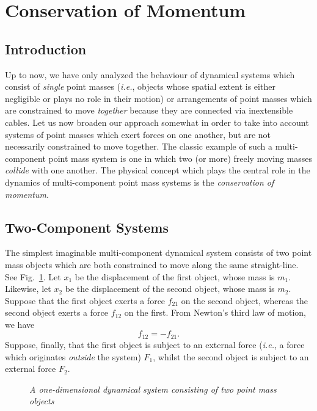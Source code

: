 \section{Conservation of Momentum}
\subsection{Introduction}
Up to now, we have  only analyzed the behaviour of dynamical systems
which consist of {\em single} point masses ({\em i.e.}, objects whose spatial extent is either
negligible or plays no role in their motion) or arrangements of point masses which are constrained to
move {\em together} because they are connected via inextensible cables. Let us now
broaden our approach somewhat  in order to take into account systems of point masses which exert forces on
one another, but are not necessarily constrained to move together. The classic example of
such a multi-component point mass
system is one in which two (or more) freely moving  masses {\em collide} with one another.
The physical concept which plays the central role in the  dynamics
of multi-component point mass systems is the {\em conservation of momentum}. 

\subsection{Two-Component Systems}
The simplest imaginable multi-component dynamical system consists of two point mass objects
which are both constrained to move along the same straight-line. See Fig.~\ref{f45}.
Let $x_1$ be the displacement of the first object, whose mass is $m_1$. Likewise, let
$x_2$ be the displacement of the second object, whose mass is $m_2$. Suppose that the
first object exerts a force $f_{21}$ on the second object, whereas the second
object exerts a force $f_{12}$ on the first. From Newton's third law of motion, we
have
\begin{equation}\label{e61}
f_{12} = - f_{21}.
\end{equation}
Suppose, finally, that the first object is subject to an external force  ({\em i.e.}, a force
which originates {\em outside} the system) $F_1$, whilst the second object is subject to an
external force $F_2$.

\begin{figure}[b]
\epsfysize=1in
\centerline{}
\caption{\em A one-dimensional dynamical system consisting of two point mass objects}\label{f45}  
\end{figure}

